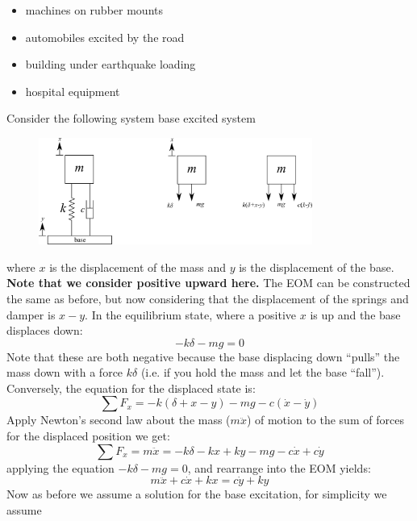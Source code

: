 \documentclass[12pt,letter]{article}
\numberwithin{ex}{section} %
\begin{document}
\begin{itemize}
\item machines on rubber mounts
\item automobiles excited by the road
\item building under earthquake loading
\item hospital equipment
\end{itemize}

Consider the following system base excited system
\begin{figure}[H]
	\centering
	\includegraphics[width=0.8\textwidth]{../Figures/base_excited_1_DOF_model_and_FBDs.png}
\end{figure}
where $x$ is the displacement of the mass and $y$ is the displacement of the base. \textbf{Note that we consider positive upward here.} The EOM can be constructed the same as before, but now considering that the displacement of the springs and damper is $x-y$.  In the equilibrium state, where a positive $x$ is up and the base displaces down:
\begin{equation}
-k\delta -mg =0
\end{equation}	
Note that these are both negative because the base displacing down ``pulls'' the mass down with a force $k\delta$ (i.e. if you hold the mass and let the base ``fall''). Conversely, the equation for the displaced state is:
\begin{equation}
\sum F_x = -k(\delta + x - y) -mg -c(\dot{x} -\dot{y})
\end{equation}	
Apply Newton's second law about the mass ($m\ddot{x}$) of motion to the sum of forces for the displaced position we get:
\begin{equation}
\sum F_x = m\ddot{x} = -k\delta -kx + ky -mg -c\dot{x} +c\dot{y}
\end{equation}	
applying the equation $-k\delta -mg =0$, and rearrange into the EOM yields:	
\begin{equation}
m\ddot{x} + c\dot{x} + kx = c\dot{y} + ky 
\end{equation}
Now as before we assume a solution for the base excitation, for simplicity we assume
\end{document}
